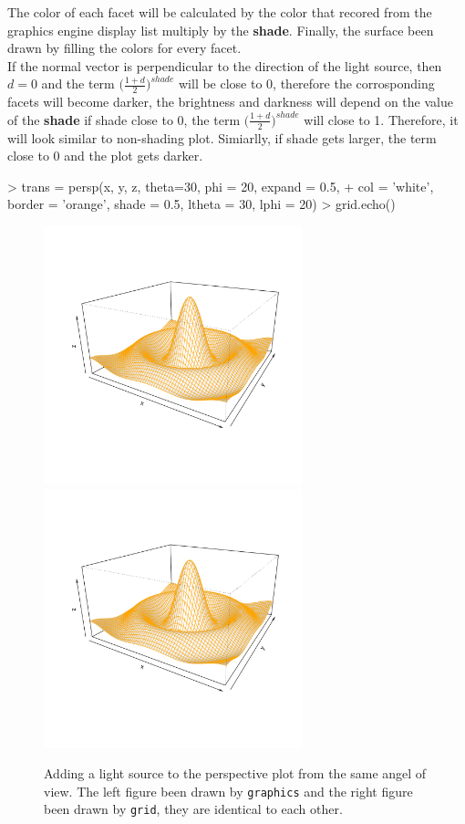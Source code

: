 \documentclass[paper=a4, fontsize=11pt]{report}
\begin{document}
The color of each facet will be calculated by the color that recored from the graphics engine display list multiply by the \textbf{shade}. Finally, the surface been drawn by filling the colors for every facet.\\

If the normal vector is perpendicular to the direction of the light source, then $d = 0$ and the term $\big(\frac{1 + d}{2}\big)^{shade}$ will be close to 0, therefore the corrosponding facets will become darker, the brightness and darkness will depend on the value of the \textbf{shade} if shade close to 0, the term $\big(\frac{1 + d}{2}\big)^{shade}$ will close to 1. Therefore, it will look similar to non-shading plot. Simiarlly, if shade gets larger, the term close to 0 and the plot gets darker.

\begin{Schunk}
\begin{Sinput}
> trans = persp(x, y, z, theta=30, phi = 20, expand = 0.5,
+  col = 'white', border = 'orange', shade = 0.5, ltheta = 30, lphi = 20)
> grid.echo()
\end{Sinput}
\end{Schunk}


\begin{figure}[h]
\begin{center}
  \includegraphics[height = 7.5cm, width = 7.5cm]{figure/Lighting_1.pdf}
  \includegraphics[height = 7.5cm, width = 7.5cm]{figure/Lighting_2.pdf}
  \caption{Adding a light source to the perspective plot from the same angel of view. The left figure been drawn by \texttt{graphics} and the right figure been drawn by \texttt{grid}, they are identical to each other.}
  	\label{figure7}
\end{center}
\end{figure}
\end{document}
